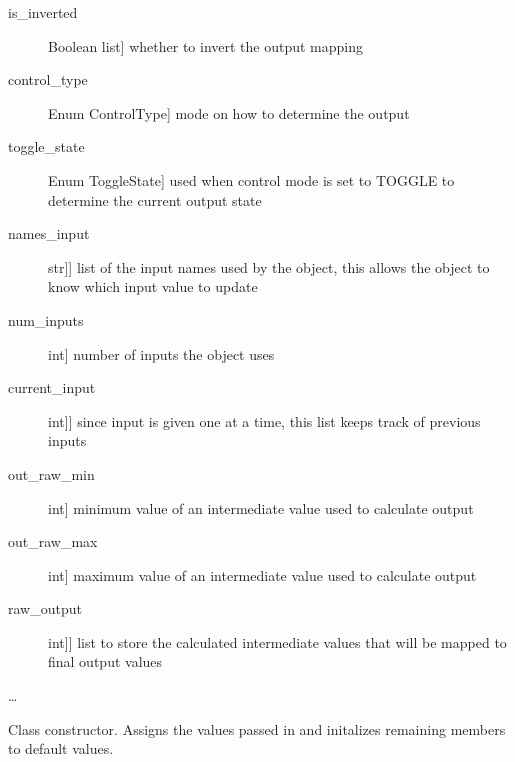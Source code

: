 \documentclass[letterpaper,10pt,english]{sphinxmanual}
\begin{document}
\begin{fulllineitems}
\begin{description}
\item[{is\_inverted}] \leavevmode{[}Boolean list{]}
\sphinxAtStartPar
whether to invert the output mapping

\item[{control\_type}] \leavevmode{[}Enum ControlType{]}
\sphinxAtStartPar
mode on how to determine the output

\item[{toggle\_state}] \leavevmode{[}Enum ToggleState{]}
\sphinxAtStartPar
used when control mode is set to TOGGLE to determine the current output state

\item[{names\_input}] \leavevmode{[}{[}str{]}{]}
\sphinxAtStartPar
list of the input names used by the object, this allows the object to know which input value to update

\item[{num\_inputs}] \leavevmode{[}int{]}
\sphinxAtStartPar
number of inputs the object uses

\item[{current\_input}] \leavevmode{[}{[}int{]}{]}
\sphinxAtStartPar
since input is given one at a time, this list keeps track of previous inputs

\item[{out\_raw\_min}] \leavevmode{[}int{]}
\sphinxAtStartPar
minimum value of an intermediate value used to calculate output

\item[{out\_raw\_max}] \leavevmode{[}int{]}
\sphinxAtStartPar
maximum value of an intermediate value used to calculate output

\item[{raw\_output}] \leavevmode{[}{[}int{]}{]}
\sphinxAtStartPar
list to store the calculated intermediate values that will be mapped to final output values

\end{description}

\sphinxAtStartPar
…

\sphinxAtStartPar
{}

\begin{fulllineitems}
\label{\detokenize{specific:SideLipOutput.SideLipOutput.__init__}}
\sphinxAtStartPar
Class constructor. Assigns the values passed in and initalizes remaining members to default values.


\end{fulllineitems}
\end{fulllineitems}
\end{document}
